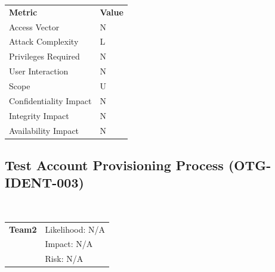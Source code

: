 \documentclass[headsepline,footsepline,footinclude=false,oneside,fontsize=11pt,paper=a4,listof=totoc,bibliography=totoc]{scrbook} %
\begin{document}
\begin{center}
	\begin{tabular}{ll}
		\rowcolor[HTML]{34CDF9}
		{\color[HTML]{ECF4FF} \textbf{Metric}}        & {\color[HTML]{ECF4FF} \textbf{Value}} \\
		\rowcolor[HTML]{BBDAFF}
		{\color[HTML]{333333} Access Vector}          & {\color[HTML]{333333} } N              \\
		\rowcolor[HTML]{ECF4FF}
		{\color[HTML]{333333} Attack Complexity}      & {\color[HTML]{333333} } L              \\
		\rowcolor[HTML]{BBDAFF}
		{\color[HTML]{333333} Privileges Required}    & {\color[HTML]{333333} } N              \\
		\rowcolor[HTML]{ECF4FF}
		{\color[HTML]{333333} User Interaction}       & {\color[HTML]{333333} } N              \\
		\rowcolor[HTML]{BBDAFF}
		{\color[HTML]{333333} Scope}                  & {\color[HTML]{333333} } U              \\
		\rowcolor[HTML]{ECF4FF}
		{\color[HTML]{333333} Confidentiality Impact} & {\color[HTML]{333333} } N              \\
		\rowcolor[HTML]{BBDAFF}
		{\color[HTML]{333333} Integrity Impact}       & {\color[HTML]{333333} } N              \\
		\rowcolor[HTML]{ECF4FF}
		{\color[HTML]{333333} Availability Impact}    & {\color[HTML]{333333} } N
	\end{tabular}
\end{center}
\pagebreak

\subsection{Test Account Provisioning Process (OTG-IDENT-003)}\
\begin{tabular}{cR{12cm}}
	\textbf{Team2} & Likelihood: N/A\\& Impact: N/A\\& Risk: N/A
\end{tabular}
\end{document}
